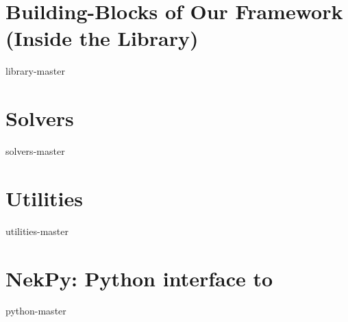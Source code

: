 
%

%

\part{Building-Blocks of Our Framework (Inside the Library)} \label{part:library}


{library-master}
\part{Solvers} \label{part:solvers}

{solvers-master}

\part{Utilities} \label{part:utilities}

{utilities-master}

\part{NekPy: Python interface to \nek{}} \label{part:nekpy}

{python-master}



 

\printindex



